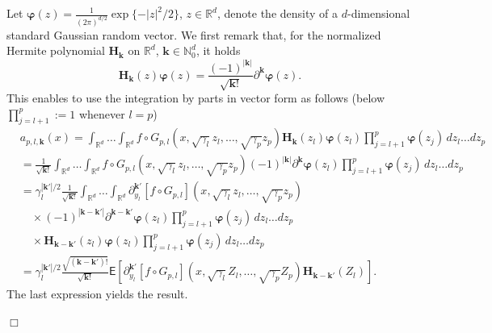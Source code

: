 \documentclass[bj]{imsart}
\newcommand{\proofendsign}{$\Box$}
\newenvironment{proof}{{\noindent \bf Proof }}
 {{\hspace*{\fill}\proofendsign\par\bigskip}}
\begin{document}
\begin{proof}
Let $\boldsymbol{\varphi}(z)=\frac{1}{(2\pi)^{d/2}} \exp\{-|z|^2/2\}$,
$z\in\mathbb R^d$, denote the density of a $d$-dimensional
standard Gaussian random vector.
We first remark that, for the normalized Hermite polynomial $\mathbf H_{\mathbf k}$ on $\mathbb R^d$,
$\mathbf k\in\mathbb N_0^d$, it holds
$$
\mathbf{H}_{\mathbf{k}}(z)\boldsymbol{\varphi}(z)
=\frac{(-1)^{|\mathbf{k}|}}{\sqrt{\mathbf{k} !}} \partial^{\mathbf{k}} \boldsymbol{\varphi}(z).
$$
This enables to use the integration by parts in vector form as follows
(below $\prod_{j=l+1}^p:=1$ whenever $l=p$)
\begin{align*}
&a_{p,l,\mathbf k}(x)
 =
\int_{\mathbb R^d}\ldots\int_{\mathbb R^d}
f\circ G_{p,l}(x,\sqrt{\gamma_{l}}z_{l},\ldots,\sqrt{\gamma_{p}}z_{p})
\mathbf{H}_{\mathbf{k}}(z_{l})\boldsymbol{\varphi}(z_l)
\prod_{j=l+1}^p\boldsymbol{\varphi}(z_j)\, dz_{l}\ldots dz_{p}
\\
& =
\frac{1}{\sqrt{\mathbf k!}}
\int_{\mathbb R^d}\ldots\int_{\mathbb R^d}
f\circ G_{p,l}(x,\sqrt{\gamma_{l}}z_{l},\ldots,\sqrt{\gamma_{p}}z_{p})
(-1)^{|\mathbf{k}|}\partial^{\mathbf{k}} \boldsymbol{\varphi}(z_l)
\prod_{j=l+1}^p\boldsymbol{\varphi}(z_j)\, dz_{l}\ldots dz_{p}
\\
& =
\gamma_l^{|\mathbf k'|/2}\frac{1}{\sqrt{\mathbf k!}}
\int_{\mathbb R^d}\ldots\int_{\mathbb R^d}
\partial_{y_l}^{\mathbf k'}[f\circ G_{p,l}](x,\sqrt{\gamma_{l}}z_{l},\ldots,\sqrt{\gamma_{p}}z_{p})
\\
&\hspace{1em}\times
(-1)^{|\mathbf{k}-\mathbf k'|}\partial^{\mathbf{k}-\mathbf k'} \boldsymbol{\varphi}(z_l)
\prod_{j=l+1}^p\boldsymbol{\varphi}(z_j)\, dz_{l}\ldots dz_{p}
\\
&\hspace{1em}\times
\mathbf{H}_{\mathbf{k}-\mathbf k'}(z_{l})\boldsymbol{\varphi}(z_l)
\prod_{j=l+1}^p\boldsymbol{\varphi}(z_j)\, dz_{l}\ldots dz_{p}
\\
 & =\gamma_{l}^{|\mathbf{k}'|/2}\frac{\sqrt{(\mathbf{k}-\mathbf{k}')!}}{\sqrt{\mathbf{k}!}}\mathsf{E}\left[\partial_{y_{l}}^{\mathbf{k}'}[f\circ G_{p,l}](x,\sqrt{\gamma_{l}}Z_{l},\ldots,\sqrt{\gamma_{p}}Z_{p})\mathbf{H}_{\mathbf{k}-\mathbf{k}'}(Z_{l})\right].
\end{align*}
The last expression yields the result.
\end{proof}
\end{document}
